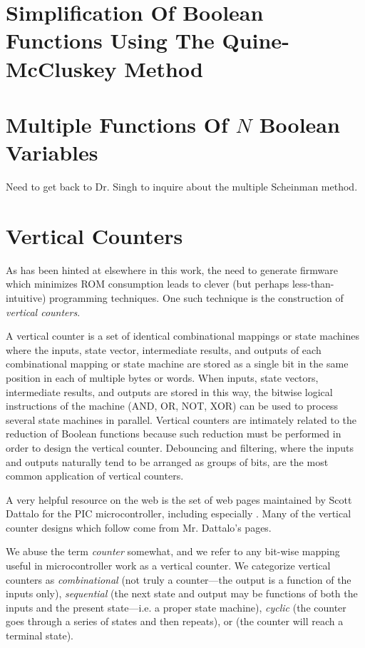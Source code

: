\section[The Quine-McCluskey Method]
        {Simplification Of Boolean Functions Using The Quine-McCluskey Method}


\section{Multiple Functions Of $N$ Boolean Variables}

Need to get back to Dr. Singh to inquire about the multiple Scheinman method.

\section{Vertical Counters}
\label{cbal0:svct0}

As has been hinted at elsewhere 
in this work, the need to generate
firmware which minimizes ROM consumption leads to clever (but perhaps
less-than-intuitive) programming techniques.  One such technique
is the construction of \emph{vertical counters}.  

A vertical counter
is a set of identical combinational mappings or state machines 
where the inputs, state vector, intermediate results, and outputs of each
combinational mapping or state machine are stored as a single bit 
in the same position 
in each of multiple bytes or words.  When inputs, state vectors,
intermediate results, and outputs are stored
in this way, the bitwise logical instructions of the machine
(AND, OR, NOT, XOR) can be used to process several state machines in
parallel.  Vertical counters are intimately related to the reduction
of Boolean functions because such reduction must be performed in order
to design the vertical counter.  Debouncing and filtering, where the 
inputs and outputs naturally tend to be arranged as groups of bits,
are the most common application of vertical counters.

A very helpful resource on the web is the set of web pages 
maintained by Scott Dattalo 
\cite{bibref:i:scottdattalo} for the
PIC microcontroller, including
especially \cite{bibref:w:sdattalovc02}.  Many of the vertical counter
designs which follow come from Mr. Dattalo's pages.

We abuse the term \emph{counter} somewhat, and we refer to 
any bit-wise mapping useful in microcontroller work as
a vertical counter.  We categorize vertical counters as 
\emph{combinational}
(not truly a counter---the output is a function of the
inputs only), \emph{sequential}
(the next state and output may be functions of both the
inputs and the present state---i.e. a proper state machine),
\emph{cyclic} (the counter
goes through a series of states and then repeats), or
 (the counter 
will reach a terminal state).

